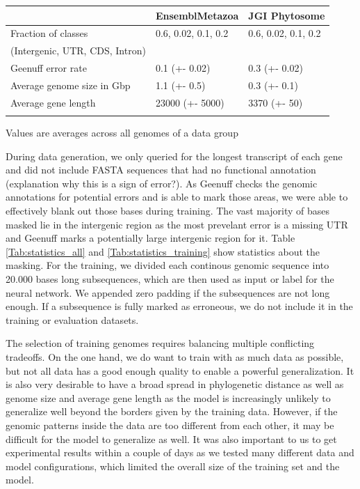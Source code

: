 \documentclass{bioinfo}
\begin{document}
\begin{methods}
\begin{table}[!t]
 {
\begin{tabular}{@{}lll@{}}
\toprule & EnsemblMetazoa & JGI Phytosome\\
\midrule
Fraction of classes  & 0.6, 0.02, 0.1, 0.2 & 0.6, 0.02, 0.1, 0.2 \\
(Intergenic, UTR, CDS, Intron) & & \\
Geenuff error rate & 0.1 (+- 0.02) & 0.3 (+- 0.02) \\
Average genome size in Gbp& 1.1 (+- 0.5) & 0.3 (+- 0.1) \\
Average gene length & 23000 (+- 5000) & 3370 (+- 50) \\
\botrule
\end{tabular}}{Values are averages across all genomes of a data group}
\end{table}

During data generation, we only queried for the longest transcript of each gene and did not include FASTA sequences that had no functional annotation (explanation why this is a sign of error?). As Geenuff checks the genomic annotations for potential errors and is able to mark those areas, we were able to effectively blank out those bases during training. The vast majority of bases masked lie in the intergenic region as the most prevelant error is a missing UTR and Geenuff marks a potentially large intergenic region for it. Table \ref{Tab:statistics_all} and \ref{Tab:statistics_training} show statistics about the masking. For the training, we divided each continous genomic sequence into 20.000 bases long subsequences, which are then used as input or label for the neural network. We appended zero padding if the subsequences are not long enough. If a subsequence is fully marked as erroneous, we do not include it in the training or evaluation datasets.

The selection of training genomes requires balancing multiple conflicting tradeoffs. On the one hand, we do want to train with as much data as possible, but not all data has a good enough quality to enable a powerful generalization. It is also very desirable to have a broad spread in phylogenetic distance as well as genome size and average gene length as the model is increasingly unlikely to generalize well beyond the borders given by the training data. However, if the genomic patterns inside the data are too different from each other, it may be difficult for the model to generalize as well. It was also important to us to get experimental results within a couple of days as we tested many different data and model configurations, which limited the overall size of the training set and the model. 
	

\end{methods}
\end{document}
